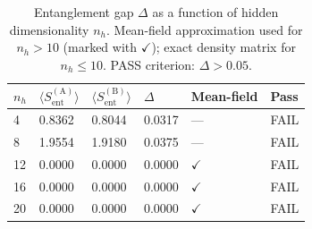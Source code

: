 \begin{table}[t]
\centering
\caption{Entanglement gap $\Delta$ as a function of hidden dimensionality $n_h$.
Mean-field approximation used for $n_h > 10$ (marked with $\checkmark$);
exact density matrix for $n_h \leq 10$. PASS criterion: $\Delta > 0.05$.}
\label{tab:dim_sweep}
\begin{tabular}{llllll}
\toprule
$n_h$ & $\langle S_\mathrm{ent}^\mathrm{(A)}\rangle$ & $\langle S_\mathrm{ent}^\mathrm{(B)}\rangle$ & $\Delta$ & Mean-field & Pass \\
\midrule
4 & 0.8362 & 0.8044 & 0.0317 & --- & FAIL \\
8 & 1.9554 & 1.9180 & 0.0375 & --- & FAIL \\
12 & 0.0000 & 0.0000 & 0.0000 & $\checkmark$ & FAIL \\
16 & 0.0000 & 0.0000 & 0.0000 & $\checkmark$ & FAIL \\
20 & 0.0000 & 0.0000 & 0.0000 & $\checkmark$ & FAIL \\
\bottomrule
\end{tabular}
\end{table}
